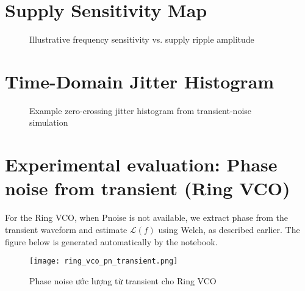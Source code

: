 \section{Supply Sensitivity Map}
\begin{figure}[H]
  \centering
  \caption{Illustrative frequency sensitivity vs. supply ripple amplitude}
\end{figure}

\section{Time-Domain Jitter Histogram}
\begin{figure}[H]
  \centering
  \caption{Example zero-crossing jitter histogram from transient-noise simulation}
\end{figure}

\section{Experimental evaluation: Phase noise from transient (Ring VCO)}
For the Ring VCO, when Pnoise is not available, we extract phase from the transient waveform and estimate \(\mathcal{L}(f)\) using Welch, as described earlier. The figure below is generated automatically by the notebook.

\begin{figure}[H]
  \centering
  \texttt{[image: ring\_vco\_pn\_transient.png]}
  \caption{Phase noise ước lượng từ transient cho Ring VCO}
\end{figure}



